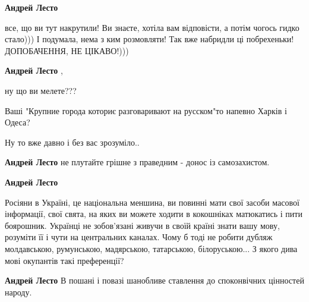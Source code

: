 \begin{itemize}
\begin{itemize}
\textbf{Андрей Лесто} 

все, що ви тут накрутили! Ви знаєте, хотіла вам відповісти, а потім чогось
гидко стало))) І подумала, нема з ким розмовляти! Так вже набридли ці
побрехеньки! ДОПОБАЧЕННЯ, НЕ ЦІКАВО!)))

 
\textbf{Андрей Лесто} ,

ну що ви мелете???

Ваші "Крупние города коториє разговаривают на русском"то напевно Харків і
Одеса?

Ну то вже давно і без вас зрозуміло..


 
\textbf{Андрей Лесто} не плутайте грішне з праведним - донос із самозахистом.

 
\textbf{Андрей Лесто} 

Росіяни в Україні, це національна меншина, ви повинні мати свої засоби масової
інформації, свої свята, на яких ви можете ходити в кокошніках матюкатись і пити
боярошник. Українці не зобов'язані живучи в своїй країні знати вашу мову,
розуміти її і чути на центральних каналах. Чому б тоді не робити дубляж
молдавською, румунською, мадярською, татарською, білоруською... З якого дива
мові окупантів такі преференції?

 
\textbf{Андрей Лесто} В пошані і повазі шанобливе ставлення до споконвічних цінностей народу.


\end{itemize}
\end{itemize}
